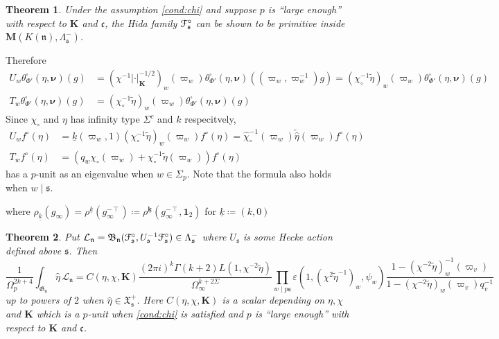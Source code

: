 \documentclass[leqno]{amsart}
\newcommand{\euF}{\EuScript{F}} %
\newcommand{\M}{\mathbf{M}} %
\newcommand{\bnu}{\boldsymbol{\nu}}
\newcommand{\wt}[1]{\underline{ #1 }}
\newcommand{\bwt}[1]{\underline{\boldsymbol { #1 }}}
\newcommand{\fG}{\mathfrak{G}}
\newcommand{\fX}{\mathfrak{X}}
\newcommand{\B}{\mathfrak B}
\newcommand{\id}{\mathbf{1}}
\newcommand{\K}{{\mathbf{K}}} %
\newcommand{\fc}{\mathfrak{c}}
\newcommand{\fs}{\mathfrak{s}}
\newcommand{\fn}{\mathfrak{n}}
\newtheorem{thm}{Theorem}[section]
\theoremstyle{definition}
\theoremstyle{remark}
\begin{document}
\begin{thm}\label{thm:intro1}
    Under the assumption \eqref{cond:chi}
    and suppose $p$ is ``large enough'' with respect to $\K$ and $\fc$,
    the Hida family $\euF^\circ_{\fs}$
    can be shown to be primitive inside $\M(K(\fn),\Lambda_{\fs}^-)$.
\end{thm}

Therefore
\begin{align*}
    U_w\theta^\square_{\Phi'}(\eta,\bnu)(g)&=
    (\chi^{-1}|\cdot|_\K^{-1/2})_w(\varpi_w)
    \theta^\square_{\Phi'}(\eta,\bnu)((\varpi_w,\varpi_w^{-1})g)
    =(\chi_\circ^{-1}\tilde{\eta})_w(\varpi_w)
    \theta^\square_{\Phi'}(\eta,\bnu)(g)\\
    T_w\theta^\square_{\Phi'}(\eta,\bnu)(g)&=
    (\chi_\circ^{-1}\tilde{\eta})_w(\varpi_w)
    \theta^\square_{\Phi'}(\eta,\bnu)(g)
\end{align*}
Since $\chi_\circ$ and $\eta$ has infinity type $\Sigma^c$ and $k$ respecitvely,
\begin{align}
    U_wf^\circ(\eta)&=
    \wt{k}(\varpi_w,1)
    (\chi_\circ^{-1}\tilde{\eta})_w(\varpi_w)f^\circ(\eta)=
    \hat{\chi}_\circ^{-1}(\varpi_w)\tilde{\hat{\eta}}(\varpi_w)f^\circ(\eta)\\
    T_wf^\circ(\eta)&=
    (q_w\chi_\circ(\varpi_w)
    +\chi_\circ^{-1}\tilde{\eta}(\varpi_w))
    f^\circ(\eta)
\end{align}
has a $p$-unit as an eigenvalue when $w\in \Sigma_p$.
Note that the formula also holds when $w\mid \fs$.


where $\rho_{\wt{k}}(g_\infty)=\rho^{\wt{k}}(g_\infty^{-\intercal})
\coloneqq \rho^{\bwt{k}}(g_\infty^{-\intercal},\id_2)$
for $\wt{k}\coloneqq (k,0)$



\begin{thm}\label{thm:intro2}
    Put $\mathcal{L}_\fn=\B_\fn(\euF^\circ_{\fs},U_\fs^{-1}\euF^\circ_{\fs})
    \in \Lambda_{\fs}^-$
    where $U_\fs$ is some Hecke action defined above $\fs$. Then
    \begin{equation*}
        \frac{1}{\Omega_p^{2k+4}}
        \int_{\fG_{\fn}}\hat{\eta}\,\mathcal{L}_\fn=
    C(\eta,\chi,\K)
    \frac{(2\pi i)^{k}\Gamma(k+2)L(1,\chi^{-2}\tilde{\eta})}{\Omega_\infty^{k+2\Sigma}}
    \prod_{w\mid p\fs}
    \varepsilon(1,(\chi^{2}\tilde{\eta}^{-1})_w,\psi_w)
    \frac{1-(\chi^{-2}\tilde{\eta})^{-1}_w(\varpi_v)}
    {1-(\chi^{-2}\tilde{\eta})_w(\varpi_v)q_v^{-1}}
    \end{equation*}
    up to powers of $2$
    when $\hat{\eta}\in \fX^+_{\fs}$.
    Here $C(\eta,\chi,\K)$ is a scalar depending on $\eta,\chi$ and $\K$
    which is a $p$-unit when \eqref{cond:chi} is satisfied 
    and $p$ is ``large enough''
    with respect to $\K$ and $\fc$. 
\end{thm}




\end{document}
